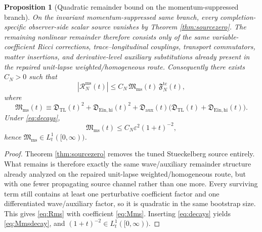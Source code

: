 \documentclass[11pt]{article}
\newtheorem{proposition}{Proposition}
\begin{document}
\begin{proposition}[Quadratic remainder bound on the momentum-suppressed branch]
\label{prop:quadratic}
On the invariant momentum-suppressed same branch, every completion-specific observer-side scalar source vanishes by Theorem \ref{thm:sourcezero}. The remaining nonlinear remainder therefore consists only of the same variable-coefficient Ricci corrections, trace--longitudinal couplings, transport commutators, matter insertions, and derivative-level auxiliary substitutions already present in the repaired unit-lapse weighted/homogeneous route. Consequently there exists \(C_N>0\) such that
\begin{equation}
|\mathcal R_N^{\mathrm{ms}}(t)|
\le
C_N\,\mathfrak M_{\mathrm{ms}}(t)\,\mathfrak F_N^{\mathrm{tc}}(t),
\label{eq:Rms}
\end{equation}
where
\begin{equation}
\mathfrak M_{\mathrm{ms}}(t)
\equiv
\mathfrak D_{\mathrm{TL}}(t)^2
+\mathfrak D_{\mathrm{Ein,hi}}(t)^2
+\mathfrak D_{\mathrm{aux}}(t)\bigl(
\mathfrak D_{\mathrm{TL}}(t)+\mathfrak D_{\mathrm{Ein,hi}}(t)
\bigr).
\label{eq:Mms}
\end{equation}
Under \eqref{eq:decays},
\begin{equation}
\mathfrak M_{\mathrm{ms}}(t)
\le
C_N\varepsilon^2(1+t)^{-2},
\label{eq:Mmsdecay}
\end{equation}
hence \(\mathfrak M_{\mathrm{ms}}\in L_t^1([0,\infty))\).
\end{proposition}

\begin{proof}
Theorem \ref{thm:sourcezero} removes the tuned Stueckelberg source entirely. What remains is therefore exactly the same wave/auxiliary remainder structure already analyzed on the repaired unit-lapse weighted/homogeneous route, but with one fewer propagating source channel rather than one more. Every surviving term still contains at least one perturbative coefficient factor and one differentiated wave/auxiliary factor, so it is quadratic in the same bootstrap size. This gives \eqref{eq:Rms} with coefficient \eqref{eq:Mms}. Inserting \eqref{eq:decays} yields \eqref{eq:Mmsdecay}, and \((1+t)^{-2}\in L_t^1([0,\infty))\).
\end{proof}
\end{document}
